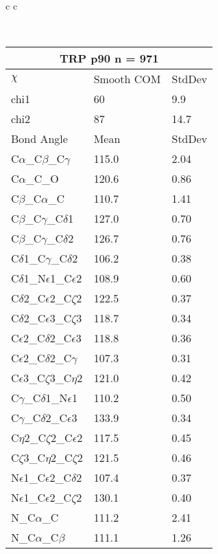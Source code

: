 \newpage

\begin{longtable}{ c c }

\caption{TRP Central Values}\\
  \begin{tabular}{ l l l }
  \toprule
  \multicolumn{3}{c}{TRP \textbf{p90} n = 971} \\ \toprule
  $\chi$       & Smooth COM & StdDev \\ \midrule
  chi1 & 60 & 9.9 \\ 
  chi2 & 87 & 14.7 \\ \midrule
  Bond Angle   & Mean     & StdDev \\ \midrule
  C$\alpha$\_C$\beta$\_C$\gamma$ & 115.0 & 2.04\\
  C$\alpha$\_C\_O & 120.6 & 0.86\\
  C$\beta$\_C$\alpha$\_C & 110.7 & 1.41\\
  C$\beta$\_C$\gamma$\_C$\delta$1 & 127.0 & 0.70\\
  C$\beta$\_C$\gamma$\_C$\delta$2 & 126.7 & 0.76\\
  C$\delta$1\_C$\gamma$\_C$\delta$2 & 106.2 & 0.38\\
  C$\delta$1\_N$\epsilon$1\_C$\epsilon$2 & 108.9 & 0.60\\
  C$\delta$2\_C$\epsilon$2\_C$\zeta$2 & 122.5 & 0.37\\
  C$\delta$2\_C$\epsilon$3\_C$\zeta$3 & 118.7 & 0.34\\
  C$\epsilon$2\_C$\delta$2\_C$\epsilon$3 & 118.8 & 0.36\\
  C$\epsilon$2\_C$\delta$2\_C$\gamma$ & 107.3 & 0.31\\
  C$\epsilon$3\_C$\zeta$3\_C$\eta$2 & 121.0 & 0.42\\
  C$\gamma$\_C$\delta$1\_N$\epsilon$1 & 110.2 & 0.50\\
  C$\gamma$\_C$\delta$2\_C$\epsilon$3 & 133.9 & 0.34\\
  C$\eta$2\_C$\zeta$2\_C$\epsilon$2 & 117.5 & 0.45\\
  C$\zeta$3\_C$\eta$2\_C$\zeta$2 & 121.5 & 0.46\\
  N$\epsilon$1\_C$\epsilon$2\_C$\delta$2 & 107.4 & 0.37\\
  N$\epsilon$1\_C$\epsilon$2\_C$\zeta$2 & 130.1 & 0.40\\
  N\_C$\alpha$\_C & 111.2 & 2.41\\
  N\_C$\alpha$\_C$\beta$ & 111.1 & 1.26\\
  \bottomrule
  \end{tabular}

\end{longtable}
